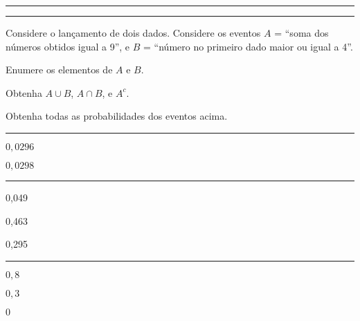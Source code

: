 \documentclass[a4paper,11pt,fleqn]{article}\usepackage[]{graphicx}\usepackage[]{color}
\theoremstyle{definition}
\begin{document}
\begin{compactenum}
\vspace{0.3cm}
\hrule
\vspace{0.3cm}

\clearpage

\vspace{0.3cm}
\hrule
\vspace{0.3cm}

\item Considere o lançamento de dois dados. Considere os eventos $A$ =
  ``soma dos números obtidos igual a 9'', e $B$ = ``número no primeiro
  dado maior ou igual a 4''.
  \begin{compactenum}
  \item Enumere os elementos de $A$ e $B$.
  \item Obtenha $A \cup B$, $A \cap B$, e $A^{c}$.
  \item Obtenha todas as probabilidades dos eventos acima.
  \end{compactenum}

\vspace{0.3cm}
\hrule
\vspace{0.3cm}

\item
  \begin{inparaenum}
  \item $0,0296$
  \item $0,0298$
  \end{inparaenum}

\vspace{0.3cm}
\hrule
\vspace{0.3cm}

\item
  \begin{inparaenum}
  \item 0,049
  \item 0,463
  \item 0,295
  \end{inparaenum}

\vspace{0.3cm}
\hrule
\vspace{0.3cm}

\item
  \begin{inparaenum}
  \item $0,8$
  \item $0,3$
  \item $0$
  \end{inparaenum}


\end{compactenum}
\end{document}
